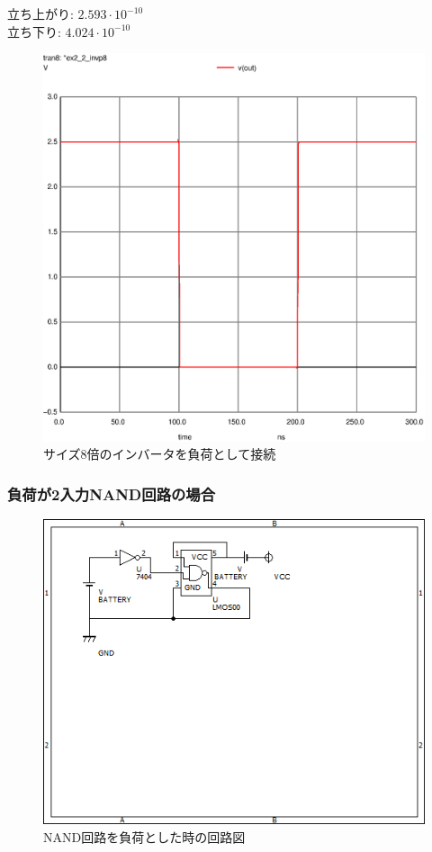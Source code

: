 \documentclass{jsarticle}
\begin{document}
\begin{flushleft}
    立ち上がり: $2.593 \cdot 10^{-10}$\\
    立ち下り: $4.024 \cdot 10^{-10}$
\end{flushleft}
\begin{figure}[H]
    \hspace{50pt}
    \includegraphics[scale=0.8]{ex2_2_invp8.ps}
    \vspace{30pt}
    \caption{サイズ8倍のインバータを負荷として接続}
\end{figure}

\subsubsection{負荷が2入力NAND回路の場合}
\begin{figure}[H]
    \centering
    \includegraphics[bb=0 0 500 400]{ex2_2_nand.png}
    \caption{NAND回路を負荷とした時の回路図}
\end{figure}
\end{document}
